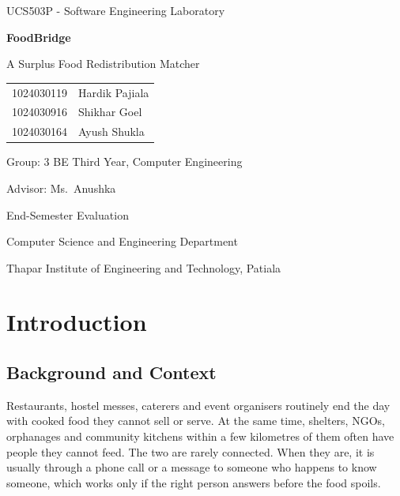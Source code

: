 \documentclass[11pt,a4paper]{report}
\begin{document}
\begin{titlepage}
\centering
{\large UCS503P - Software Engineering Laboratory\par}
\vspace{3cm}
{\Huge\bfseries FoodBridge\par}
\vspace{0.5cm}
{\Large A Surplus Food Redistribution Matcher\par}
\vspace{3cm}
\begin{tabular}{ll}
1024030119 & Hardik Pajiala \\
1024030916 & Shikhar Goel \\
1024030164 & Ayush Shukla \\
\end{tabular}
\par\vspace{1.2cm}
{\large Group: 3 \quad BE Third Year, Computer Engineering\par}
\vspace{0.4cm}
{\large Advisor: Ms.\ Anushka\par}
\vfill
{\large End-Semester Evaluation\par}
\vspace{0.8cm}
{\large Computer Science and Engineering Department\par}
{\large Thapar Institute of Engineering and Technology, Patiala\par}
\end{titlepage}

\tableofcontents
\clearpage

\chapter{Introduction}

\section{Background and Context}

Restaurants, hostel messes, caterers and event organisers routinely end the day
with cooked food they cannot sell or serve. At the same time, shelters, NGOs,
orphanages and community kitchens within a few kilometres of them often have
people they cannot feed. The two are rarely connected. When they are, it is
usually through a phone call or a message to someone who happens to know
someone, which works only if the right person answers before the food spoils.
\end{document}
